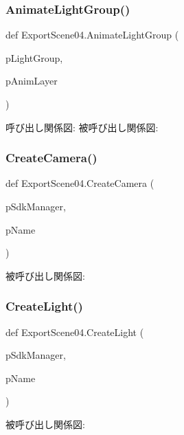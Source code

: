 \subsubsection{\texorpdfstring{Animate\+Light\+Group()}{AnimateLightGroup()}}
{\footnotesize\ttfamily def Export\+Scene04.\+Animate\+Light\+Group (\begin{DoxyParamCaption}\item[{}]{p\+Light\+Group,  }\item[{}]{p\+Anim\+Layer }\end{DoxyParamCaption})}

呼び出し関係図\+:
被呼び出し関係図\+:
\mbox{\label{namespace_export_scene04_ad5c23035cb609de3546d7870bd3473a1}} 
\subsubsection{\texorpdfstring{Create\+Camera()}{CreateCamera()}}
{\footnotesize\ttfamily def Export\+Scene04.\+Create\+Camera (\begin{DoxyParamCaption}\item[{}]{p\+Sdk\+Manager,  }\item[{}]{p\+Name }\end{DoxyParamCaption})}

被呼び出し関係図\+:
\mbox{\label{namespace_export_scene04_ac5e54114e9e956163719747d8cce4328}} 
\subsubsection{\texorpdfstring{Create\+Light()}{CreateLight()}}
{\footnotesize\ttfamily def Export\+Scene04.\+Create\+Light (\begin{DoxyParamCaption}\item[{}]{p\+Sdk\+Manager,  }\item[{}]{p\+Name }\end{DoxyParamCaption})}

被呼び出し関係図\+:
\mbox{\label{namespace_export_scene04_a962a3371b858479959c4953219f251d2}} 

